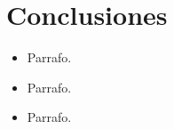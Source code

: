 \chapter{Conclusiones}

    \begin{itemize}
		\item Parrafo.
		\item Parrafo.
		\item Parrafo.
    \end{itemize}
    
